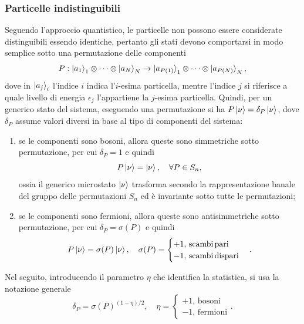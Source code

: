 \subsubsection{Particelle indistinguibili}
Seguendo l'approccio quantistico, le particelle non possono essere considerate distinguibili essendo identiche, pertanto gli stati devono comportarsi in modo semplice sotto una permutazione delle componenti 
\begin{equation}
\label{eq: stati sotto permutazione}
    P : \ket{a_1}_1 \otimes \cdots \otimes \ket{a_N}_N \to \ket{a_{P(1)}}_1 \otimes \cdots \otimes \ket{a_{P(N)}}_N,
\end{equation}
dove in $\ket{a_j}_i$ l'indice $i$ indica l'$i$-esima particella, mentre l'indice $j$ si riferisce a quale livello di energia $\epsilon_j$ l'appartiene la $j$-esima particella. Quindi, per un generico stato del sistema, eseguendo una permutazione si ha $P\ket{\nu} = \delta_P\ket{\nu}$, dove $\delta_P$ assume valori diversi in base al tipo di componenti del sistema:
\begin{enumerate}
    \item se le componenti sono bosoni, allora queste sono simmetriche sotto permutazione, per cui $\delta_P = 1$ e quindi
    \begin{equation}
    \label{eq: permutazioni bosoni}
        P\ket{\nu} = \ket{\nu},\quad \forall P \in S_n,
    \end{equation}
    ossia il generico microstato $\ket{\nu}$ trasforma secondo la rappresentazione banale del gruppo delle permutazioni $S_n$ ed è invariante sotto tutte le permutazioni;
    \item se le componenti sono fermioni, allora queste sono antisimmetriche sotto permutazione, per cui $\delta_P = \sigma(P)$ e quindi
    \begin{equation}
    \label{eq: permutazioni fermioni}
        P\ket{\nu} = \sigma(P)\ket{\nu},\quad \sigma(P) = 
        \begin{cases}
            +1,\,\mathrm{scambi\,pari} \\
            -1,\,\mathrm{scambi\,dispari}
        \end{cases}.
    \end{equation}
\end{enumerate}
Nel seguito, introducendo il parametro $\eta$ che identifica la statistica, si usa la notazione generale
\begin{equation}
    \delta_P = \sigma(P)^{(1-\eta)/2},\quad \eta = 
    \begin{cases}
        +1,\,\mathrm{bosoni} \\
        -1,\,\mathrm{fermioni}
    \end{cases}.
\end{equation}
